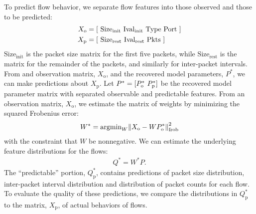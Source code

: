 \documentclass{acm_proc_article-sp}
\begin{document}
To predict flow behavior, we separate flow features into those observed and those to be predicted:
\begin{align}
  X_\text{o} &= {\left[ ~
    \text{Size}_\text{init} ~
    \text{Ival}_\text{init} ~
    \text{Type} ~
    \text{Port} ~
  \right]} \\
  X_\text{p} &= {\left[ ~
    \text{Size}_\text{rest} ~
    \text{Ival}_\text{rest} ~
    \text{Pkts} ~
  \right]}
\end{align}
$\text{Size}_\text{init}$ is the packet size matrix for the first five packets, while $\text{Size}_\text{rest}$ is the matrix for the remainder of the packets, and similarly for inter-packet intervals.
From and observation matrix, $X_\text{o}$, and the recovered model parameters, $P^*$, we can make predictions about $X_\text{p}$.
Let $P^* = {[P^*_\text{o}~P^*_\text{p}]}$ be the recovered model parameter matrix  with separated observable and predictable features.
From an observation matrix, $X_\text{o}$, we estimate the matrix of weights by minimizing the squared Frobenius error:
\begin{align}
  W^* = \text{argmin}_W {{\left\lVert X_\text{o} - W P^*_\text{o}\right\rVert}^2_\text{frob}}
\end{align}
with the constraint that $W$ be nonnegative.
We can estimate the underlying feature distributions for the flows:
\begin{align}
  Q^* = W^*P.
\end{align}
The ``predictable'' portion, $Q^*_\text{p}$, contains predictions of packet size distribution, inter-packet interval distribution and distribution of packet counts for each flow.
To evaluate the quality of these predictions, we compare the distributions in $Q^*_\text{p}$ to the matrix, $X_\text{p}$, of actual behaviors of flows.
\end{document}
